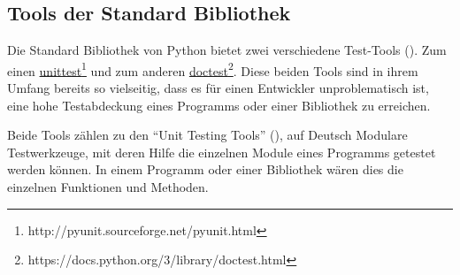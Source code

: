 \subsection{Tools der Standard Bibliothek}\label{python-tools:stdlib}

Die Standard Bibliothek von Python bietet zwei verschiedene Test-Tools (\cite{wiki.python:PythonTestingToolsTaxonomy}).
Zum einen
\href{http://pyunit.sourceforge.net/pyunit.html}{unittest}\footnote{http://pyunit.sourceforge.net/pyunit.html}
und zum anderen
\href{https://docs.python.org/3/library/doctest.html}{doctest}\footnote{https://docs.python.org/3/library/doctest.html}.
Diese beiden Tools sind in ihrem Umfang bereits so vielseitig, dass es für
einen Entwickler unproblematisch ist, eine hohe Testabdeckung eines Programms
oder einer Bibliothek zu erreichen.
\newline

Beide Tools zählen zu den "`Unit Testing Tools"' 
(\cite{wiki.python:PythonTestingToolsTaxonomy}),
auf Deutsch Modulare Testwerkzeuge, mit deren Hilfe die einzelnen Module eines 
Programms getestet werden können. In einem Programm oder einer Bibliothek wären 
dies die einzelnen Funktionen und Methoden.



